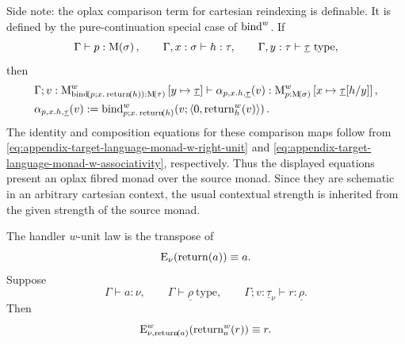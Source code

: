 \documentclass[11pt,a4paper]{article}
\theoremstyle{definition}
\theoremstyle{remark}
\providecommand{\casubst}[3]{#1[#3/#2]}
\providecommand{\lintype}[1]{\underline{#1}}
\begin{document}
Side note: the oplax comparison term for cartesian reindexing is definable.  It is
defined by the pure-continuation special case of \( \opn[b]{bind}^{w} \).  If
\[
  \Gamma\vdash p:\Fun[nn]{\opn[b]{M}}{\sigma},
  \qquad
  \Gamma,x:\sigma\vdash h:\tau,
  \qquad
  \Gamma,y:\tau\vdash \lintype{\tau}\ \mathrm{type},
\]
then
\begin{equation}
  \label{eq:appendix-target-language-monad-w-alpha}
  \begin{aligned}
    &
    \Gamma;
    v:
    \opn[b]{M}^{w}_{
      \fn[n]{\opn[b]{bind}}{
        p;
        x.\fn[n]{\opn[b]{return}}{h}
      }
      :
      \Fun[nn]{\opn[b]{M}}{\tau}
    }
    \left[y\mapsto\lintype{\tau}\right]
    \vdash
    \alpha_{p,x.h,\lintype{\tau}}(v)
    :
    \opn[b]{M}^{w}_{p:\Fun[nn]{\opn[b]{M}}{\sigma}}
    \left[
      x\mapsto\casubst{\lintype{\tau}}{y}{h}
    \right],
    \\
    &
    \alpha_{p,x.h,\lintype{\tau}}(v)
    :=
    \fn[n]{
      \opn[b]{bind}^{w}_{
        p;
        x.\fn[n]{\opn[b]{return}}{h}
      }
    }{
      v;
      \tuple{
        \opn[b]{0},
        \fn[n]{\opn[b]{return}^{w}_{h}}{v}
      }
    }.
  \end{aligned}
\end{equation}
The identity and composition equations for these comparison maps follow from
\eqref{eq:appendix-target-language-monad-w-right-unit} and
\eqref{eq:appendix-target-language-monad-w-associativity}, respectively.
Thus the displayed equations present an oplax fibred monad over the source
monad.  Since they are schematic in an arbitrary cartesian context, the usual
contextual strength is inherited from the given strength of the source monad.



The handler \(w\)-unit law is the transpose of
\[
  \fn[n]{\opn[b]{E}_{\nu}}{
    \fn[n]{\opn[b]{return}}{a}
  }
  \equiv
  a.
\]
Suppose
\[
  \Gamma\vdash a:\nu,
  \qquad
  \Gamma\vdash \lintype{\rho}\ \mathrm{type},
  \qquad
  \Gamma;v:\lintype{\tau}_{\nu}\vdash r:\lintype{\rho}.
\]
Then
\begin{equation}
  \label{eq:appendix-target-language-handler-w-unit}
  \fn[n]{
    \opn[b]{E}^{w}_{
      \nu,
      \fn[n]{\opn[b]{return}}{a}
    }
  }{
    \fn[n]{\opn[b]{return}^{w}_{a}}{r}
  }
  \equiv
  r .
\end{equation}
\end{document}
